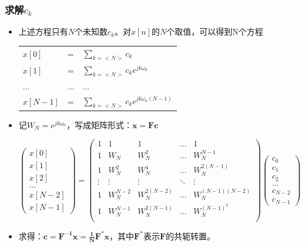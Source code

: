 \documentclass[CJKutf8,xcolor=pdftex,dvipsnames,table]{beamer}
\begin{document}
\begin{CJK*}{UTF8}{song}
  \begin{frame}
    \frametitle{求解$c_k$}
    \begin{itemize}
    \item 上述方程只有$N$个未知数$c_k$。对$x[n]$的$N$个取值，可以得到N个方程
    \begin{center}
    \begin{tabular}{lll}
    $x[0]$ & = & $\sum_{k=<N>} c_k$    \\
    $x[1]$ & = & $\sum_{k=<N>} c_k e^{jk \omega_0}$ \\
    ...    & ... & ... \\
    $x[N-1]$ & = & $\sum_{k=<N>} c_k e^{jk \omega_0 (N-1)} $ \\
    \end{tabular} 
    \end{center}
    \item 记$W_N=e^{jk\omega_0}$，写成矩阵形式：$\mathbf{x = Fc}$
    \begin{center}
    \[
    \begin{pmatrix}
x[0]  \\
x[1]  \\
x[2]  \\
...   \\
x[N-2] \\
x[N-1]
	\end{pmatrix}    
	=
    \begin{pmatrix}
1      & 1   & 1     & ... & 1 \\
1      & W_N & W_N^2 & ... & W_N^{N-1} \\
1      & W_N^2 & W_N^4 & ... & W_N^{2(N-1)} \\
\vdots & \vdots & \vdots  & \ddots & \vdots \\
1      & W_N^{N-2} & W_N^{2(N-2)} & ... & W_N^{(N-1)(N-2)} \\
1      & W_N^{N-1} & W_N^{2(N-1)} & ... & W_N^{(N-1)^2} \\

	\end{pmatrix}
    \begin{pmatrix}
c_0  \\
c_1  \\
c_2  \\
...   \\
c_{N-2} \\
c_{N-1}
	\end{pmatrix} 	
	\]    
    \end{center} 
 
    \item 求得：$\mathbf{c = F^{-1}x=\frac{1}{N}F^*x}$，其中$\mathbf{F^*}$表示$\mathbf{F}$的共轭转置。



\end{itemize}
\end{frame}
\end{CJK*}
\end{document}
